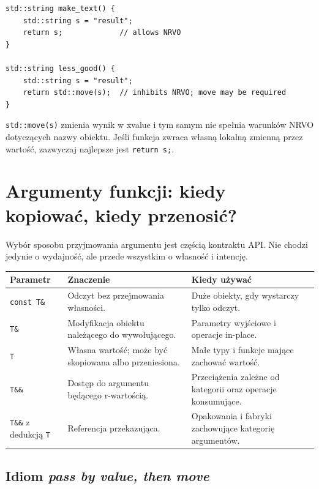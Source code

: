 \begin{lstlisting}
std::string make_text() {
    std::string s = "result";
    return s;             // allows NRVO
}

std::string less_good() {
    std::string s = "result";
    return std::move(s);  // inhibits NRVO; move may be required
}
\end{lstlisting}

\texttt{std::move(s)} zmienia wynik w xvalue i tym samym
nie spełnia warunków NRVO dotyczących nazwy obiektu.
Jeśli funkcja zwraca własną lokalną zmienną przez wartość,
zazwyczaj najlepsze jest \texttt{return s;}.

\section{Argumenty funkcji: kiedy kopiować, kiedy przenosić?}
\label{sec:move-api}

Wybór sposobu przyjmowania argumentu jest częścią kontraktu API.
Nie chodzi jedynie o wydajność, ale przede wszystkim o własność
i intencję.

\begin{center}
\begin{tabular}{|p{3.4cm}|p{4.3cm}|p{4.7cm}|}
\hline
\textbf{Parametr} & \textbf{Znaczenie} & \textbf{Kiedy używać} \\
\hline
\texttt{const T\&} & Odczyt bez przejmowania własności. & Duże obiekty, gdy wystarczy tylko odczyt. \\
\hline
\texttt{T\&} & Modyfikacja obiektu należącego do wywołującego. & Parametry wyjściowe i operacje in-place. \\
\hline
\texttt{T} & Własna wartość; może być skopiowana albo przeniesiona. & Małe typy i funkcje mające zachować wartość. \\
\hline
\texttt{T\&\&} & Dostęp do argumentu będącego r-wartością. & Przeciążenia zależne od kategorii oraz operacje konsumujące. \\
\hline
\texttt{T\&\&} z dedukcją \texttt{T} & Referencja przekazująca. & Opakowania i fabryki zachowujące kategorię argumentów. \\
\hline
\end{tabular}
\end{center}

\subsection{Idiom \emph{pass by value, then move}}

